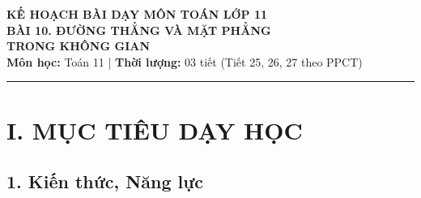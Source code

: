 \documentclass[12pt, a4paper]{article}
\begin{document}
\begin{center}
    {\Large \textbf{KẾ HOẠCH BÀI DẠY MÔN TOÁN LỚP 11}}\\[0.4em]
    {\LARGE \textbf{BÀI 10. ĐƯỜNG THẲNG VÀ MẶT PHẲNG}}\\[0.3em]
    {\LARGE \textbf{TRONG KHÔNG GIAN}}\\[0.5em]
    \textbf{Môn học:} Toán 11 | \textbf{Thời lượng:} 03 tiết (Tiết 25, 26, 27 theo PPCT)
\end{center}

\vspace{0.5em}
\hrule
\vspace{1em}

\section*{I. MỤC TIÊU DẠY HỌC}

\subsection*{1. Kiến thức, Năng lực}
\end{document}
